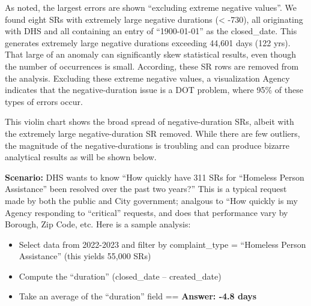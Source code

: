 \documentclass[12pt, titlepage]{article}
\begin{document}
	
As noted, the largest errors are shown ``excluding extreme negative values''. We found 
eight SRs with extremely large negative durations (\textless{} -730), all originating
with DHS and all containing an entry of ``1900-01-01'' as the closed\_date. This 
generates extremely large negative durations exceeding 44,601 
days (122 yrs). That large of an anomaly can significantly skew statistical 
results, even though the number of occurrences is small. According, these 
SR rows are removed from the analysis. Excluding these extreme negative
values, a visualization Agency indicates that the negative-duration 
issue is a DOT problem, where 95\% of these types of errors occur. 
	
	
This violin chart shows the broad spread of negative-duration SRs, albeit with 
the extremely large negative-duration SR removed. While there are few 
outliers, the magnitude of the negative-durations is troubling and can 
produce bizarre analytical results as will be shown below.




\label{sec:homlessassistance}
\textbf{Scenario:} DHS wants to know ``How quickly have 311 SRs
for ``Homeless Person Assistance'' been resolved over the 
past two years?'' This is a typical request made by 
both the public and City government; analgous to ``How quickly 
is my Agency responding to ``critical'' requests, and does 
that performance vary by Borough, Zip Code, etc. Here is a
sample analysis:
		
		
\begin{itemize}
    \item Select data from 2022-2023 and filter by complaint\_type = 
    ``Homeless Person Assistance'' (this yields 55,000 SRs)
    
    \item Compute the ``duration'' (closed\_date – created\_date)
    
    \item Take an average of the ``duration'' field == \textbf{Answer:  -4.8 days}  
\end{itemize}
\end{document}
